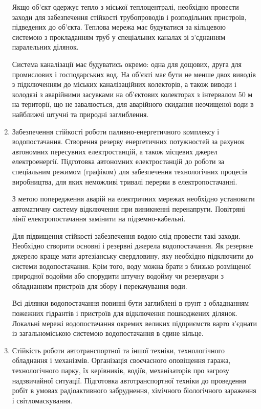 \begin{enumerate}
	      Якщо об'єкт одержує тепло з міської теплоцентралі, необхідно провести заходи для забезпечення стійкості трубопроводів і розподільних пристроїв, підведених до об'єкта. Теплова мережа має будуватися за кільцевою системою з прокладанням труб у спеціальних каналах зі з'єднанням паралельних ділянок.

	      Система каналізації має будуватись окремо: одна для дощових, друга для промислових і господарських вод. На об'єкті має бути не менше двох виводів з підключенням до міських каналізаційних колекторів, а також виводи і колодязі з аварійними засувками на об'єктових колекторах з інтервалом 50 м на території, що не завалюється, для аварійного скидання неочищеної води в найближчі штучні та природні заглиблення.
	\item Забезпечення стійкості роботи паливно-енергетичного комплексу і водопостачання. Створення резерву енергетичних потужностей за рахунок автономних пересувних електростанцій, а також місцевих джерел електроенергії. Підготовка автономних електростанцій до роботи за спеціальним режимом (графіком) для забезпечення технологічних процесів виробництва, для яких неможливі тривалі перерви в електропостачанні.

	      З метою попередження аварій на електричних мережах необхідно установити автоматичну систему відключення при виникненні перенапруги. Повітряні лінії електропостачання замінити на підземно-кабельні.

	      Для підвищення стійкості забезпечення водою слід провести такі заходи. Необхідно створити основні і резервні джерела водопостачання. Як резервне джерело краще мати артезіанську свердловину, яку необхідно підключити до системи водопостачання. Крім того, воду можна брати з близько розміщеної природної водойми або спорудити штучну водойму чи резервуари з обладнанням пристроїв для збору і перекачування води.

	      Всі ділянки водопостачання повинні бути заглиблені в ґрунт з обладнанням пожежних гідрантів і пристроїв для відключення пошкоджених ділянок. Локальні мережі водопостачання окремих великих підприємств варто з'єднати із загальноміською системою водопостачання в єдине кільце.
	\item Стійкість роботи автотранспортної та іншої техніки, технологічного обладнання і механізмів. Організація своєчасного оповіщення гаража, технологічного парку, їх керівників, водіїв, механізаторів про загрозу надзвичайної ситуації. Підготовка автотранспортної техніки до проведення робіт в умовах радіоактивного забруднення, хімічного біологічного зараження і світломаскування.


\end{enumerate}
